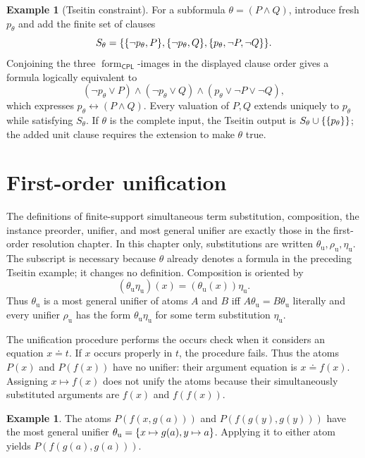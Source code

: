 \documentclass[11pt,oneside,openany]{book}
\theoremstyle{definition}
\newtheorem{example}[definition]{Example}
\theoremstyle{plain}
\theoremstyle{remark}
\DeclarePairedDelimiter{\set}{\lbrace}{\rbrace}
\newcommand{\CPL}{\mathsf{CPL}}
\begin{document}
\begin{example}[Tseitin constraint]
For a subformula \(\theta=(P\land Q)\), introduce fresh \(p_\theta\) and add
the finite set of clauses
\[
  S_\theta=
  \set{
    \set{\neg p_\theta,P},
    \set{\neg p_\theta,Q},
    \set{p_\theta,\neg P,\neg Q}
  }.
\]
Conjoining the three \(\operatorname{form}_{\CPL}\)-images in the displayed
clause order gives a formula logically equivalent to
\[
  (\neg p_\theta\lor P)\land
  (\neg p_\theta\lor Q)\land
  (p_\theta\lor\neg P\lor\neg Q),
\]
which expresses \(p_\theta\leftrightarrow(P\land Q)\).
Every valuation of \(P,Q\) extends uniquely to \(p_\theta\) while satisfying
\(S_\theta\).  If \(\theta\) is the complete input, the Tseitin output is
\(S_\theta\cup\set{\set{p_\theta}}\); the added unit clause requires the
extension to make \(\theta\) true.
\end{example}

\section{First-order unification}
\label{sec:automated-reasoning-03}

The definitions of finite-support simultaneous term substitution, composition,
the instance preorder, unifier, and most general unifier are exactly those in
the first-order resolution chapter.  In this chapter only, substitutions are
written \(\theta_{\mathrm u},\rho_{\mathrm u},\eta_{\mathrm u}\).  The
subscript is necessary because \(\theta\) already denotes a formula in the
preceding Tseitin example; it changes no definition.  Composition is oriented
by
\[
  (\theta_{\mathrm u}\eta_{\mathrm u})(x)
  =(\theta_{\mathrm u}(x))\eta_{\mathrm u}.
\]
Thus \(\theta_{\mathrm u}\) is a most general unifier of atoms \(A\) and
\(B\) iff \(A\theta_{\mathrm u}=B\theta_{\mathrm u}\) literally and every
unifier \(\rho_{\mathrm u}\) has the form
\(\theta_{\mathrm u}\eta_{\mathrm u}\) for some term substitution
\(\eta_{\mathrm u}\).

The unification procedure performs the occurs check when it considers an
equation \(x\doteq t\).  If \(x\) occurs properly in \(t\), the procedure
fails.  Thus the atoms \(P(x)\) and \(P(f(x))\) have no unifier: their
argument equation is \(x\doteq f(x)\).  Assigning \(x\mapsto f(x)\) does not
unify the atoms because their simultaneously substituted arguments are
\(f(x)\) and \(f(f(x))\).

\begin{example}
The atoms \(P(f(x,g(a)))\) and \(P(f(g(y),g(y)))\) have the most general
unifier
\(\theta_{\mathrm u}=\set{x\mapsto g(a),y\mapsto a}\).  Applying it to
either atom yields \(P(f(g(a),g(a)))\).
\end{example}
\end{document}
